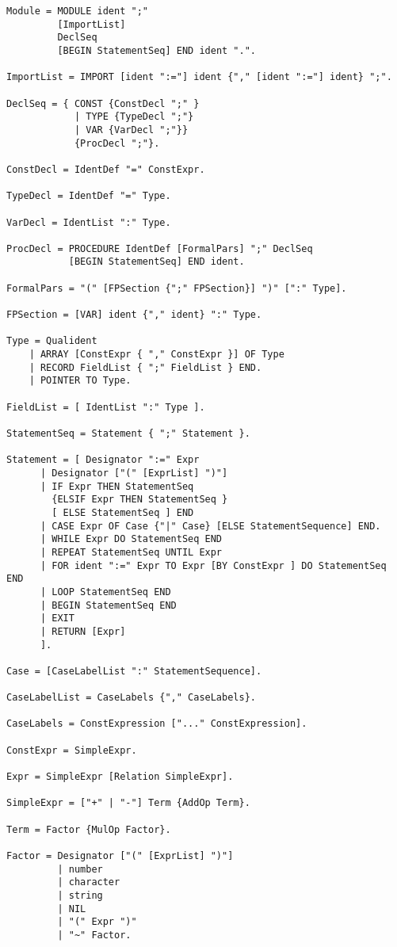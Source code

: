 \documentclass[12pt]{article}
\begin{document}
{\scriptsize
\begin{lstlisting}[style=EBNF]
Module = MODULE ident ";" 
         [ImportList] 
         DeclSeq 
         [BEGIN StatementSeq] END ident ".".

ImportList = IMPORT [ident ":="] ident {"," [ident ":="] ident} ";".

DeclSeq = { CONST {ConstDecl ";" } 
            | TYPE {TypeDecl ";"} 
            | VAR {VarDecl ";"}} 
            {ProcDecl ";"}.

ConstDecl = IdentDef "=" ConstExpr.

TypeDecl = IdentDef "=" Type.

VarDecl = IdentList ":" Type.

ProcDecl = PROCEDURE IdentDef [FormalPars] ";" DeclSeq 
           [BEGIN StatementSeq] END ident.

FormalPars = "(" [FPSection {";" FPSection}] ")" [":" Type].

FPSection = [VAR] ident {"," ident} ":" Type.

Type = Qualident
    | ARRAY [ConstExpr { "," ConstExpr }] OF Type
    | RECORD FieldList { ";" FieldList } END.
    | POINTER TO Type.

FieldList = [ IdentList ":" Type ].
    
StatementSeq = Statement { ";" Statement }.

Statement = [ Designator ":=" Expr
      | Designator ["(" [ExprList] ")"]
      | IF Expr THEN StatementSeq 
        {ELSIF Expr THEN StatementSeq } 
        [ ELSE StatementSeq ] END
      | CASE Expr OF Case {"|" Case} [ELSE StatementSequence] END. 
      | WHILE Expr DO StatementSeq END
      | REPEAT StatementSeq UNTIL Expr
      | FOR ident ":=" Expr TO Expr [BY ConstExpr ] DO StatementSeq END
      | LOOP StatementSeq END
      | BEGIN StatementSeq END
      | EXIT
      | RETURN [Expr] 
      ].

Case = [CaseLabelList ":" StatementSequence].

CaseLabelList = CaseLabels {"," CaseLabels}.

CaseLabels = ConstExpression ["..." ConstExpression].

ConstExpr = SimpleExpr.

Expr = SimpleExpr [Relation SimpleExpr].

SimpleExpr = ["+" | "-"] Term {AddOp Term}.

Term = Factor {MulOp Factor}.

Factor = Designator ["(" [ExprList] ")"] 
         | number 
         | character
         | string
         | NIL
         | "(" Expr ")" 
         | "~" Factor.


\end{lstlisting}}
\end{document}
